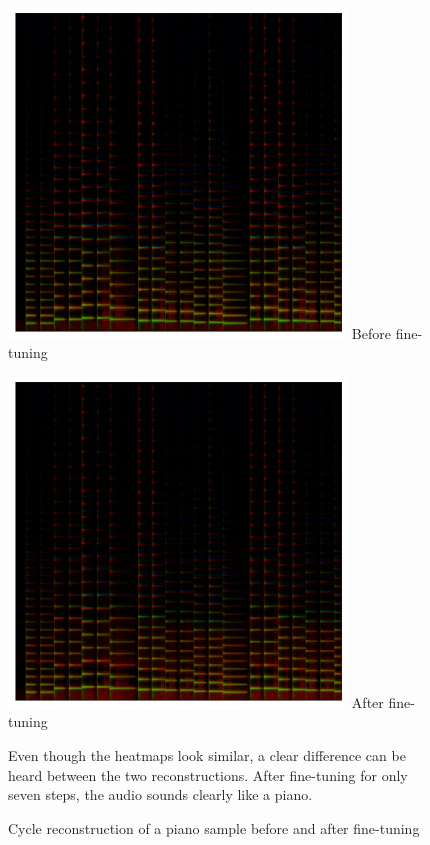 \begin{figure}
    \begin{minipage}[b]{0.45\textwidth}
        \centering
        \includegraphics[width=0.8\textwidth]{figures/fine-tuning/twinkle-initial-cycled.png}
        \small{\newline Before fine-tuning}
    \end{minipage}
    \hfill
    \begin{minipage}[b]{0.45\textwidth}
        \centering
        \includegraphics[width=0.8\textwidth]{figures/fine-tuning/exp1/twinkle-cycled-tuned.png}
        \small{\newline After fine-tuning}
    \end{minipage}
    \caption{Cycle reconstruction of a piano sample before and after fine-tuning}
    \label{fig:fine-tune-example-1}
    \small{Even though the heatmaps look similar, a clear difference can be heard between the two reconstructions. After fine-tuning for only seven steps, the audio sounds clearly like a piano.}
\end{figure}



